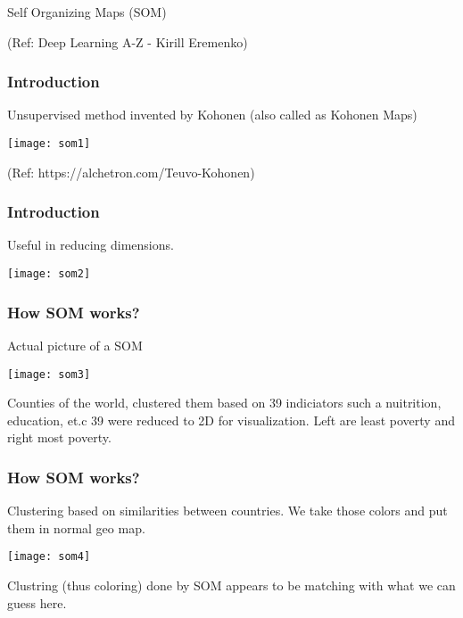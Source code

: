 \begin{frame}
  \begin{center}
    {\Large Self Organizing Maps (SOM)}
    
\tiny{(Ref: Deep Learning A-Z -  Kirill Eremenko)}      
  \end{center}
  

\end{frame}

\begin{frame}[fragile] \frametitle{Introduction}

Unsupervised method invented by Kohonen (also called as Kohonen Maps)


\begin{center}
\texttt{[image: som1]}

\tiny{(Ref: https://alchetron.com/Teuvo-Kohonen)}
\end{center}

\end{frame}

\begin{frame}[fragile] \frametitle{Introduction}
Useful in reducing dimensions.

\begin{center}
\texttt{[image: som2]}
\end{center}

\end{frame}


\begin{frame}[fragile] \frametitle{How SOM works?}
Actual picture of a SOM

\begin{center}
\texttt{[image: som3]}
\end{center}

Counties of the world, clustered them based on 39 indiciators such a nuitrition, education, et.c 39 were reduced to 2D for visualization.
Left are least poverty and right most poverty.
\end{frame}

\begin{frame}[fragile] \frametitle{How SOM works?}
Clustering based on similarities between countries. We take those colors and put them in normal geo map.

\begin{center}
\texttt{[image: som4]}
\end{center}

Clustring (thus coloring) done by SOM appears to be matching with what we can guess here.
\end{frame}

